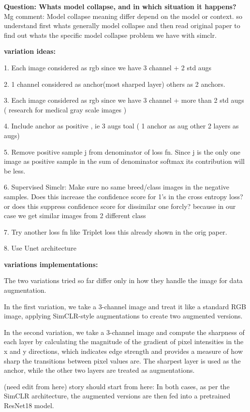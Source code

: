 \documentclass[12pt,twoside,a4paper,parskip]{scrbook} %
\begin{document}
\textbf{Question: Whats model collapse, and in which situation it happens?}
Mg comment: Model collapse meaning differ depend on the model or context. so understand first whats generally model collapse and then read original paper to find out whats the specific model collapse problem we have with simclr.

\textbf{variation ideas:}

1. Each image considered as rgb since we have 3 channel + 2 std augs

2. 1 channel considered as anchor(most sharped layer) others as 2 anchors.

3. Each image considered as rgb since we have 3 channel + more than 2 std augs ( research for medical gray scale images )

4. Include anchor as positive , ie 3 augs  toal ( 1 anchor as aug other 2 layers as augs)

5. Remove positive sample j from denominator of loss fn. Since j is the  only one image as positive sample in the sum of denominator softmax its contribution will be less.

6. Supervised Simclr: Make sure no same breed/class images in the negative samples. Does this increase the confidence score for 1's in the cross entropy loss? or does this suppress confidence score for dissimilar one forcly? because in our case we get similar images from 2 different class 

7. Try another loss fn like Triplet loss this already shown in the orig paper.

8. Use Unet architecture  

\textbf{variations implementations:}

The two variations tried so far differ only in how they handle the image for data augmentation. 

In the first variation, we take a 3-channel image and treat it like a standard RGB image, applying SimCLR-style augmentations to create two augmented versions.

In the second variation, we take a 3-channel image and compute the sharpness of each layer by calculating the magnitude of the gradient of pixel intensities in the x and y directions, which indicates edge strength and provides a measure of how sharp the transitions between pixel values are. The sharpest layer is used as the anchor, while the other two layers are treated as augmentations. 

(need edit from here)
story should start from here:
In both cases, as per the SimCLR architecture, the augmented versions are then fed into a pretrained ResNet18 model.
\end{document}
